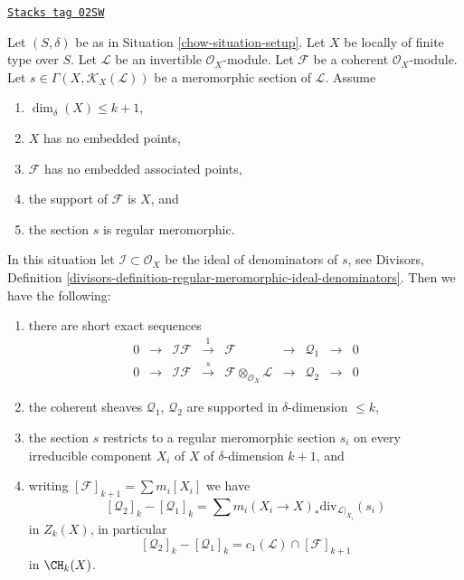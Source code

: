 \begin{lemma}
\label{chow-lemma-no-embedded-points}
\href{https://stacks.math.columbia.edu/tag/02SW}{\texttt{Stacks tag 02SW}}

Let $(S, \delta)$ be as in Situation \ref{chow-situation-setup}.
Let $X$ be locally of finite type over $S$.
Let $\mathcal{L}$ be an invertible $\mathcal{O}_X$-module.
Let $\mathcal{F}$ be a coherent $\mathcal{O}_X$-module.
Let $s \in \Gamma(X, \mathcal{K}_X(\mathcal{L}))$ be a
meromorphic section of $\mathcal{L}$.
Assume
\begin{enumerate}
\item $\dim_\delta(X) \leq k + 1$,
\item $X$ has no embedded points,
\item $\mathcal{F}$ has no embedded associated points,
\item the support of $\mathcal{F}$ is $X$, and
\item the section $s$ is regular meromorphic.
\end{enumerate}
In this situation let $\mathcal{I} \subset \mathcal{O}_X$
be the ideal of denominators of $s$, see
Divisors,
Definition \ref{divisors-definition-regular-meromorphic-ideal-denominators}.
Then we have the following:
\begin{enumerate}
\item there are short exact sequences
$$
\begin{matrix}
0 &
\to &
\mathcal{I}\mathcal{F} &
\xrightarrow{1} &
\mathcal{F} &
\to &
\mathcal{Q}_1 &
\to &
0 \\
0 &
\to &
\mathcal{I}\mathcal{F} &
\xrightarrow{s} &
\mathcal{F} \otimes_{\mathcal{O}_X} \mathcal{L} &
\to &
\mathcal{Q}_2 &
\to &
0
\end{matrix}
$$
\item the coherent sheaves $\mathcal{Q}_1$, $\mathcal{Q}_2$
are supported in $\delta$-dimension $\leq k$,
\item the section $s$ restricts to a regular meromorphic
section $s_i$ on every irreducible component $X_i$ of
$X$ of $\delta$-dimension $k + 1$, and
\item writing $[\mathcal{F}]_{k + 1} = \sum m_i[X_i]$ we have
$$
[\mathcal{Q}_2]_k - [\mathcal{Q}_1]_k
=
\sum m_i(X_i \to X)_*\text{div}_{\mathcal{L}|_{X_i}}(s_i)
$$
in $Z_k(X)$, in particular
$$
[\mathcal{Q}_2]_k - [\mathcal{Q}_1]_k
=
c_1(\mathcal{L}) \cap [\mathcal{F}]_{k + 1}
$$
in $\CH_k(X)$.
\end{enumerate}
\end{lemma}


